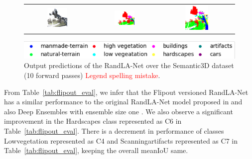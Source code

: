 \begin{figure}[h!]
\begin{tabular}{ccc}
            \includegraphics[width=0.33\textwidth, height=0.18\textheight]{images/seg_output/sem3d_seg_output/3_RGB.pdf} &
            \includegraphics[width=0.33\textwidth, height=0.18\textheight]{images/seg_output/sem3d_seg_output/3_GT.pdf}& 
            \includegraphics[width=0.33\textwidth, height=0.18\textheight]{images/seg_output/flipout/sem3d_3.pdf}\\
        \end{tabular}
        \includegraphics[scale=0.65]{images/legend.png}
        \caption{Output predictions of the RandLA-Net over the Semantic3D dataset (10 forward passes) \textcolor{red}{Legend spelling mistake}.}
        \label{fig:flipout_vis_sem3d}
    \end{figure}   

    From Table~\ref{tab:flipout_eval}, we infer that the Flipout versioned RandLA-Net has a similar performance to the original RandLA-Net model proposed in \cite{Hu_2020_CVPR_Randla} and also Deep Ensembles with ensemble size one .
    We also observe a significant improvement in the Hardscapes class represented as C6 in Table~\ref{tab:flipout_eval}.
    There is a decrement in performance of classes Lowvegetation represented as C4 and Scanningartifacts represented as C7 in Table~\ref{tab:flipout_eval}, keeping the overall meanIoU same.
    

